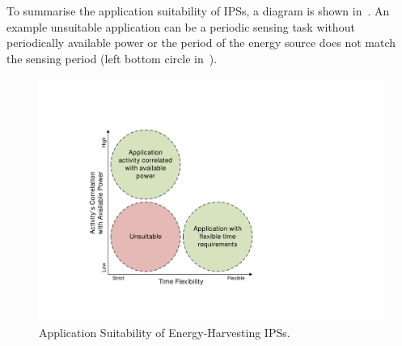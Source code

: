 To summarise the application suitability of IPSs, a diagram is shown in~. 
An example unsuitable application can be a periodic sensing task without periodically available power or the period of the energy source does not match the sensing period (left bottom circle in~).

\begin{figure}[!htb]
  \centering
  \includegraphics[width=0.7\columnwidth]{ch1_intro/figures/appsuit2}
  \caption{Application Suitability of Energy-Harvesting IPSs.}
  \label{Figure:appsuit}
\end{figure}


